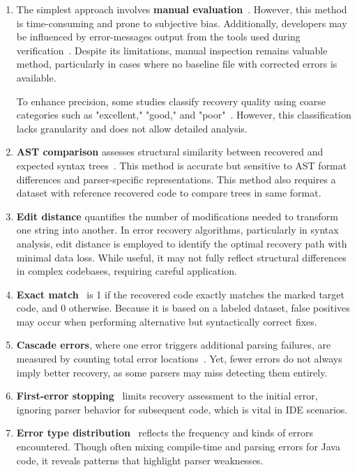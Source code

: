 \documentclass[conference]{IEEEtran}
\begin{document}
\begin{enumerate}
    \item The simplest approach involves \textbf{manual evaluation}~\cite{forward-move, natural_recovery}. However, this method is time-consuming and prone to subjective bias. Additionally, developers may be influenced by error-messages output from the tools used during verification~\cite{panic}. Despite its limitations, manual inspection remains valuable method, particularly in cases where no baseline file with corrected errors is available. 
    
    To enhance precision, some studies classify recovery quality using coarse categories such as "excellent," "good," and "poor"~\cite{forward-move}. 
    However, this classification lacks granularity and does not allow detailed analysis.

    \item \textbf{AST comparison} assesses structural similarity between recovered and expected syntax trees~\cite{natural_recovery, fuzz_recovery}. This method is accurate but sensitive to AST format differences and parser-specific representations. This method also requires a dataset with reference recovered code to compare trees in same format.

    \item \textbf{Edit distance}\cite{editing-distance} quantifies the number of modifications needed to transform one string into another. In error recovery algorithms, particularly in syntax analysis, edit distance is employed to identify the optimal recovery path with minimal data loss\cite{panic}. While useful, it may not fully reflect structural differences in complex codebases, requiring careful application. 

    \item \textbf{Exact match}~\cite{exact-match-ai} is 1 if the recovered code exactly matches the marked target code, and 0 otherwise. Because it is based on a labeled dataset, false positives may occur when performing alternative but syntactically correct fixes. 
    

    \item \textbf{Cascade errors}, where one error triggers additional parsing failures, are measured by counting total error locations~\cite{panic}. Yet, fewer errors do not always imply better recovery, as some parsers may miss detecting them entirely.

    \item \textbf{First-error stopping}~\cite{first-errors, error-frequence} limits recovery assessment to the initial error, ignoring parser behavior for subsequent code, which is vital in IDE scenarios.

    \item \textbf{Error type distribution}~\cite{error-frequence} reflects the frequency and kinds of errors encountered. Though often mixing compile-time and parsing errors for Java code, it reveals patterns that highlight parser weaknesses.
\end{enumerate}
\end{document}
